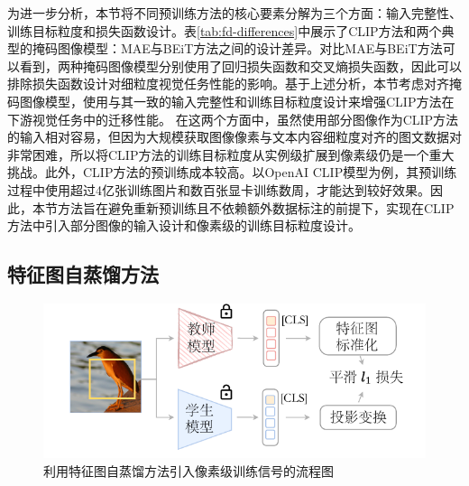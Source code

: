 为进一步分析，本节将不同预训练方法的核心要素分解为三个方面：输入完整性、训练目标粒度和损失函数设计。表\ref{tab:fd-differences}中展示了CLIP方法和两个典型的掩码图像模型：MAE与BEiT\cite{bao2021beit}方法之间的设计差异。对比MAE与BEiT方法可以看到，两种掩码图像模型分别使用了回归损失函数和交叉熵损失函数，因此可以排除损失函数设计对细粒度视觉任务性能的影响。基于上述分析，本节考虑对齐掩码图像模型，使用与其一致的输入完整性和训练目标粒度设计来增强CLIP方法在下游视觉任务中的迁移性能。
在这两个方面中，虽然使用部分图像作为CLIP方法的输入相对容易\cite{FLIP}，但因为大规模获取图像像素与文本内容细粒度对齐的图文数据对非常困难，所以将CLIP方法的训练目标粒度从实例级扩展到像素级仍是一个重大挑战。此外，CLIP方法的预训练成本较高。以OpenAI CLIP模型为例，其预训练过程中使用超过4亿张训练图片和数百张显卡训练数周，才能达到较好效果。因此，本节方法旨在避免重新预训练且不依赖额外数据标注的前提下，实现在CLIP方法中引入部分图像的输入设计和像素级的训练目标粒度设计。

\subsection{特征图自蒸馏方法}

\begin{figure}
  \centering
  \includegraphics[width=0.8\linewidth]{figures/fd-overall.pdf}
  \caption{利用特征图自蒸馏方法引入像素级训练信号的流程图}
  \label{fig:fd-overall}
\end{figure}



